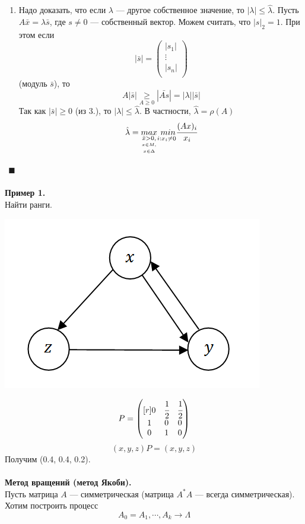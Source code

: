 \documentclass[12pt]{article}
\theoremstyle{definition}
\numberwithin{equation}{section}
\begin{document}
\begin{enumerate}
    \item Надо доказать, что если $\lambda$ --- другое собственное значение, то $|\lambda|\leqslant \hat \lambda$. Пусть $A\bar x=\lambda \bar s$, где $s\neq 0$ --- собственный вектор. Можем считать, что $|s|_2=1$. При этом если 
    \[|\bar s| = \begin{pmatrix}
|s_1|\\
\vdots\\
|s_n|\\
\end{pmatrix}\]
    (модуль $\bar s$), то $$A|\bar s| \underset{A\geqslant 0}{\geqslant} |\bar{As}|=|\lambda||\bar s|$$
    Так как $|\bar s| \geqslant 0$ (из 3.), то $|\lambda|\leqslant \hat \lambda$. В частности, $\hat \lambda=\rho(A)$
    $$\hat \lambda =\underset{\underset{x\in \Delta}{\underset{x\in M,}{\bar x>0,}}}{max} \underset{i:x_i\neq 0}{~min}\cfrac{(Ax)_i}{x_i}$$
\end{enumerate} $~~\blacksquare$\\
\\
\textbf{Пример 1.}\\
Найти ранги.
\begin{center}
\includegraphics[scale=0.8]{l15_5.png}\\
\end{center}
\[P = \begin{pmatrix}[r]
0 & \cfrac{1}{2} & \cfrac{1}{2}\\
1 & 0 & 0\\
0 & 1 & 0\\
\end{pmatrix}\]
$$(x, y, z)P=(x, y, z)$$
Получим (0.4, 0.4, 0.2).\\
\\
\textbf{Метод вращений (метод Якоби).}\\
Пусть матрица $A$ --- симметрическая (матрица $A^*A$ --- всегда симметрическая). Хотим построить процесс $$A_0=A_1,\cdots, A_k \to \Lambda$$
\end{document}

